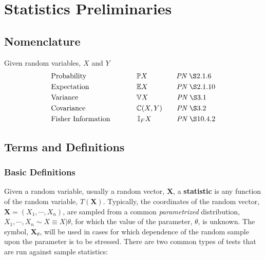 \documentclass[12pt, twoside, draft]{article}
\begin{document}
\section{Statistics Preliminaries}\label{sec:statistics_preliminaries}

\subsection{Nomenclature}
Given random variables, $X$ and $Y$
\begin{align}
&\text{Probability} \hspace{70pt} \mathbb{P}X \hspace{40pt} \textit{PN } \S 2.1.6 \notag \\
&\text{Expectation} \hspace{66pt} \mathbb{E}X \hspace{40pt} \textit{PN } \S 2.1.10 \notag \\
&\text{Variance} \hspace{81pt} \mathbb{V} X \hspace{40pt} \textit{PN } \S 3.1 \notag \\
&\text{Covariance} \hspace{71pt} \mathbb{C}(X, Y) \hspace{20pt} \textit{PN } \S 3.2 \notag\\
&\text{Fisher Information} \hspace{38pt} \mathbb{I}_F X \hspace{35pt} \textit{PN } \S 10.4.2 \notag
\end{align}


\subsection{Terms and Definitions}
\subsubsection{Basic Definitions}
Given a random variable, usually a random vector, $\mathbf{X}$, a \textbf{statistic} is any function of the random variable, $T(\mathbf{X})$. Typically, the coordinates of the random vector, $\mathbf{X} = (X_1, \cdots, X_n)$, are sampled from a common \textit{parametrized} distribution, $X_1, \cdots, X_n \sim  X \equiv X | \theta$, for which the value of the parameter, $\theta$, is unknown.  The symbol, $\mathbf{X}_\theta$, will be used in cases for which dependence of the random sample upon the parameter is to be stressed. There are two common types of tests that are run against sample statistics:
\end{document}
